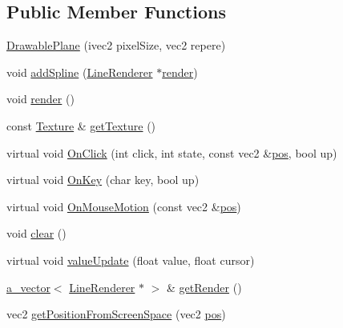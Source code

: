 \subsection*{Public Member Functions}
\begin{DoxyCompactItemize}
\item 
\hyperlink{class_agmd_1_1_drawable_plane_a880fc03ecbf702687fbc1f49eadbb36a}{Drawable\+Plane} (ivec2 pixel\+Size, vec2 repere)
\item 
void \hyperlink{class_agmd_1_1_drawable_plane_a2391933443bed5f5ede7b1d3e432a7fe}{add\+Spline} (\hyperlink{class_agmd_1_1_line_renderer}{Line\+Renderer} $\ast$\hyperlink{class_agmd_1_1_drawable_plane_a0b7ad80f3bdb5bc7a38838ecc9f3c9af}{render})
\item 
void \hyperlink{class_agmd_1_1_drawable_plane_a0b7ad80f3bdb5bc7a38838ecc9f3c9af}{render} ()
\item 
const \hyperlink{class_agmd_1_1_texture}{Texture} \& \hyperlink{class_agmd_1_1_drawable_plane_a6d08c87bd7d97ffba48a01e729af7d7f}{get\+Texture} ()
\item 
virtual void \hyperlink{class_agmd_1_1_drawable_plane_afa0378c703f4c6829782b622c03ffdb2}{On\+Click} (int click, int state, const vec2 \&\hyperlink{_examples_2_planet_2_app_8cpp_aa8a1c0491559faca4ebd0881575ae7f0}{pos}, bool up)
\item 
virtual void \hyperlink{class_agmd_1_1_drawable_plane_aac9621336d61d3fc92ef84ff6cf339df}{On\+Key} (char key, bool up)
\item 
virtual void \hyperlink{class_agmd_1_1_drawable_plane_a0c6c87999f5252cf3559b31212d32d62}{On\+Mouse\+Motion} (const vec2 \&\hyperlink{_examples_2_planet_2_app_8cpp_aa8a1c0491559faca4ebd0881575ae7f0}{pos})
\item 
void \hyperlink{class_agmd_1_1_drawable_plane_aec667a45b3c0bad09d83162da2619ac9}{clear} ()
\item 
virtual void \hyperlink{class_agmd_1_1_drawable_plane_a4014f7ff890cfc0940755f3628170060}{value\+Update} (float value, float cursor)
\item 
\hyperlink{_vector_8h_a3df82cea60ff4ad0acb44e58454406a5}{a\+\_\+vector}$<$ \hyperlink{class_agmd_1_1_line_renderer}{Line\+Renderer} $\ast$ $>$ \& \hyperlink{class_agmd_1_1_drawable_plane_aa369b21b311bf6c072104dce41513d4c}{get\+Render} ()
\item 
vec2 \hyperlink{class_agmd_1_1_drawable_plane_aa2b3d9098faa673d2e95b05aa0e412a7}{get\+Position\+From\+Screen\+Space} (vec2 \hyperlink{_examples_2_planet_2_app_8cpp_aa8a1c0491559faca4ebd0881575ae7f0}{pos})
\end{DoxyCompactItemize}
